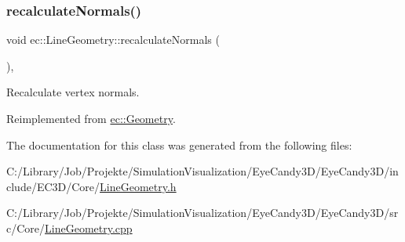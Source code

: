 \mbox{\label{classec_1_1_line_geometry_a7a0b22930aa566c97d5f86f2a8246696}} 
\subsubsection{\texorpdfstring{recalculate\+Normals()}{recalculateNormals()}}
{\footnotesize\ttfamily void ec\+::\+Line\+Geometry\+::recalculate\+Normals (\begin{DoxyParamCaption}{ }\end{DoxyParamCaption})\hspace{0.3cm}{\ttfamily [override]}, {\ttfamily [virtual]}}



Recalculate vertex normals. 



Reimplemented from \mbox{\hyperlink{classec_1_1_geometry_a228d4a0fa01a17379f24aee2c769b501}{ec\+::\+Geometry}}.



The documentation for this class was generated from the following files\+:\begin{DoxyCompactItemize}
\item 
C\+:/\+Library/\+Job/\+Projekte/\+Simulation\+Visualization/\+Eye\+Candy3\+D/\+Eye\+Candy3\+D/include/\+E\+C3\+D/\+Core/\mbox{\hyperlink{_line_geometry_8h}{Line\+Geometry.\+h}}\item 
C\+:/\+Library/\+Job/\+Projekte/\+Simulation\+Visualization/\+Eye\+Candy3\+D/\+Eye\+Candy3\+D/src/\+Core/\mbox{\hyperlink{_line_geometry_8cpp}{Line\+Geometry.\+cpp}}\end{DoxyCompactItemize}
